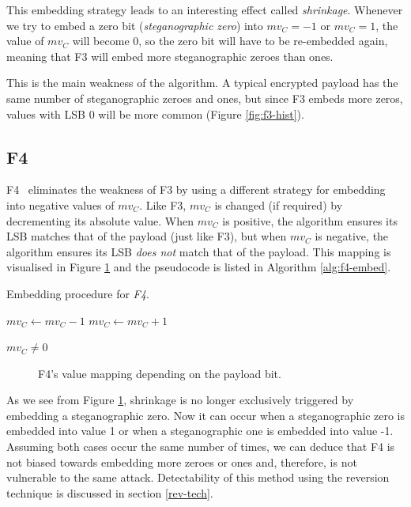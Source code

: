 \documentclass[12pt,british,twoside,notitlepage,usenames,dvipsnames,hypens,final]{report}
\numberwithin{equation}{section}
\numberwithin{figure}{section}
\begin{document}
This embedding strategy leads to an interesting effect called \emph{shrinkage}. Whenever we try to embed a zero bit (\emph{steganographic zero}) into $mv_C = -1$ or $mv_C = 1$, the value of $mv_C$ will become 0, so the zero bit will have to be re-embedded again, meaning that F3 will embed more steganographic zeroes than ones. 

This is the main weakness of the algorithm. A typical encrypted payload has the same number of steganographic zeroes and ones, but since F3 embeds more zeros, values with LSB 0 will be more common (Figure \ref{fig:f3-hist}). 

\subsection{F4}

F4~\cite{f5} eliminates the weakness of F3 by using a different strategy for embedding into negative values of $mv_C$. Like F3, $mv_C$ is changed (if required) by decrementing its absolute value. When $mv_C$ is positive, the algorithm ensures its LSB matches that of the payload (just like F3), but when $mv_C$ is negative, the algorithm ensures its LSB \emph{does not} match that of the payload. This mapping is visualised in Figure \ref{fig:f4-mapping} and the pseudocode is listed in Algorithm \ref{alg:f4-embed}.

\begin{algorithm}
\caption{Embedding procedure for \emph{F4}.}
\label{alg:f4-embed}
\begin{algorithmic}
    \State $mv_C \gets mv_C - 1$ 
\EndIf
{}
	\State $mv_C \gets mv_C + 1$ 
\EndIf

\State \Return $mv_C \neq 0$
\EndProcedure
\end{algorithmic}
\end{algorithm}

\begin{figure}[tbh]
\centering
\resizebox{0.75\textwidth}{!}{}
\caption{F4's value mapping depending on the payload bit.}
\label{fig:f4-mapping}
\end{figure}

As we see from Figure \ref{fig:f4-mapping}, shrinkage is no longer exclusively triggered by embedding a steganographic zero. Now it can occur when a steganographic zero is embedded into value 1 or when a steganographic one is embedded into value -1. Assuming both cases occur the same number of times, we can deduce that F4 is not biased towards embedding more zeroes or ones and, therefore, is not vulnerable to the same attack. Detectability of this method using the reversion technique is discussed in section \ref{rev-tech}.
\end{document}
